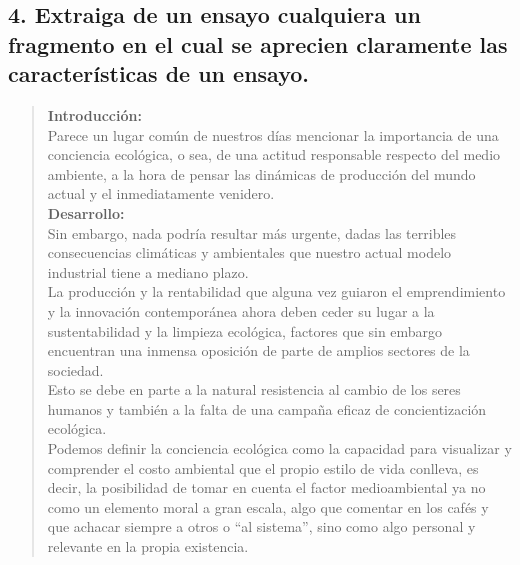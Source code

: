 \documentclass[a4paper,man,natbib]{apa6}
\begin{document}
\subsection{4. Extraiga de un ensayo cualquiera un fragmento en el cual se aprecien claramente las características de un ensayo.}
\begin{quote}

    \vspace{5pt}
    {\small
        \textbf{Introducción:}\\
        Parece un lugar común de nuestros días mencionar la importancia de una conciencia ecológica, o sea, de una actitud responsable respecto del medio ambiente, a la hora de pensar las dinámicas de producción del mundo actual y el inmediatamente venidero.\\
        \textbf{Desarrollo:}\\
        Sin embargo, nada podría resultar más urgente, dadas las terribles consecuencias climáticas y ambientales que nuestro actual modelo industrial tiene a mediano plazo.\\
        La producción y la rentabilidad que alguna vez guiaron el emprendimiento y la innovación contemporánea ahora deben ceder su lugar a la sustentabilidad y la limpieza ecológica, factores que sin embargo encuentran una inmensa oposición de parte de amplios sectores de la sociedad. \\
        Esto se debe en parte a la natural resistencia al cambio de los seres humanos y también a la falta de una campaña eficaz de concientización ecológica.\\
        Podemos definir la conciencia ecológica como la capacidad para visualizar y comprender el costo ambiental que el propio estilo de vida conlleva, es decir, la posibilidad de tomar en cuenta el factor medioambiental ya no como un elemento moral a gran escala, algo que comentar en los cafés y que achacar siempre a otros o “al sistema”, sino como algo personal y relevante en la propia existencia.

}
\end{quote}
\end{document}

